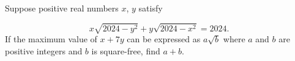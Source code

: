 Suppose positive real numbers $x$, $y$ satisfy

$$x\sqrt{2024-y^2}+y\sqrt{2024-x^2}=2024.$$If the maximum value of $x+7y$ can be expressed as $a\sqrt{b}$ where $a$ and $b$ are positive integers and $b$ is square-free, find $a+b$.

